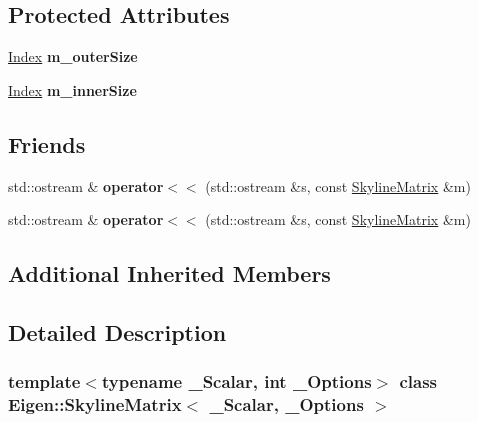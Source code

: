 \subsection*{Protected Attributes}
\begin{DoxyCompactItemize}
\item 
\mbox{\label{class_eigen_1_1_skyline_matrix_afc2112b0b77ab1937c2adbdcb4c23e5f}} 
\hyperlink{group___core___module_a554f30542cc2316add4b1ea0a492ff02}{Index} {\bfseries m\+\_\+outer\+Size}
\item 
\mbox{\label{class_eigen_1_1_skyline_matrix_acc7668f1df272117e2a4681a947bf082}} 
\hyperlink{group___core___module_a554f30542cc2316add4b1ea0a492ff02}{Index} {\bfseries m\+\_\+inner\+Size}
\end{DoxyCompactItemize}
\subsection*{Friends}
\begin{DoxyCompactItemize}
\item 
\mbox{\label{class_eigen_1_1_skyline_matrix_a3edffb2dac6fdd2868b1ac37916c3a4c}} 
std\+::ostream \& {\bfseries operator$<$$<$} (std\+::ostream \&s, const \hyperlink{class_eigen_1_1_skyline_matrix}{Skyline\+Matrix} \&m)
\item 
\mbox{\label{class_eigen_1_1_skyline_matrix_a3edffb2dac6fdd2868b1ac37916c3a4c}} 
std\+::ostream \& {\bfseries operator$<$$<$} (std\+::ostream \&s, const \hyperlink{class_eigen_1_1_skyline_matrix}{Skyline\+Matrix} \&m)
\end{DoxyCompactItemize}
\subsection*{Additional Inherited Members}


\subsection{Detailed Description}
\subsubsection*{template$<$typename \+\_\+\+Scalar, int \+\_\+\+Options$>$\newline
class Eigen\+::\+Skyline\+Matrix$<$ \+\_\+\+Scalar, \+\_\+\+Options $>$}

